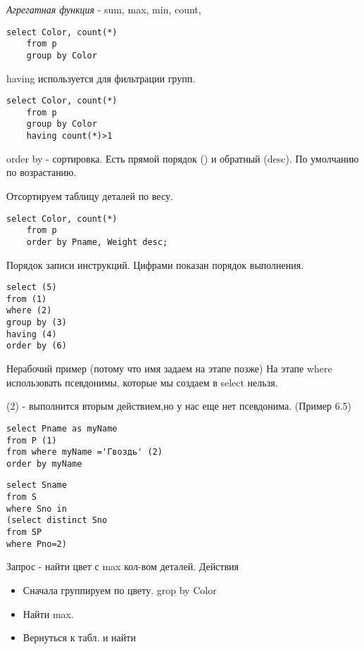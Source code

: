 \textit{Агрегатная функция} - sum, max, min, count,

\begin{lstlisting}[label=some-code,caption=Пример]
	select Color, count(*)
	from p
	group by Color
\end{lstlisting}


having используется для фильтрации групп.

\begin{lstlisting}[label=some-code,caption=Пример]
	select Color, count(*)
	from p
	group by Color
	having count(*)>1
\end{lstlisting}

order by - сортировка. Есть прямой порядок () и обратный (desc).
По умолчанию по возрастанию.

Отсортируем таблицу деталей по весу.

\begin{lstlisting}[label=some-code,caption=Пример]
	select Color, count(*)
	from p
	order by Pname, Weight desc;
\end{lstlisting}

Порядок записи инструкций.
Цифрами показан порядок выполнения.


\begin{lstlisting}[label=some-code,caption=Порядок записи инструкций]
select (5)
from (1)
where (2)
group by (3)
having (4)
order by (6)
\end{lstlisting}

Нерабочий пример (потому что имя задаем на этапе позже)
На этапе where использовать псевдонимы, которые мы создаем в select нельзя.

(2) - выполнится вторым действием,но у нас еще нет псевдонима. (Пример 6.5)

\begin{lstlisting}[label=some-code,caption=Пример]
select Pname as myName
from P (1)
from where myName ='Гвоздь' (2)
order by myName
\end{lstlisting}

\begin{lstlisting}[label=some-code,caption=Пример внутренних запросов]
select Sname 
from S
where Sno in 
(select distinct Sno
from SP
where Pno=2)
\end{lstlisting}

Запрос - найти цвет с max кол-вом деталей.
Действия
\begin{itemize}
	\item Сначала группируем по цвету. grop by Color
	\item Найти max.
	\item Вернуться к табл. и найти
\end{itemize}

